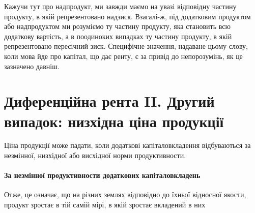 Кажучи тут про надпродукт, ми завжди маємо на увазі відповідну
частину продукту, в якій репрезентовано надзиск. Взагалі-ж, під додатковим
продуктом або надпродуктом ми розуміємо ту частину продукту, яка становить
всю додаткову вартість, а в поодиноких випадках ту частину продукту, в якій
репрезентовано пересічний зиск. Специфічне значення, надаване цьому слову,
коли мова йде про капітал, що дає ренту, є за привід до непорозумінь, як це
зазначено давніш.

\section{Диференційна рента II. Другий випадок: низхідна ціна продукції}

\vspace{3\bigskipamount}
Ціна продукції може падати, коли додаткові капіталовкладення відбуваються
за незмінної, низхідної або висхідної норми продуктивности.

\paragraph{За незмінної продуктивности додаткових капіталовкладень}

Отже, це означає, що на різних землях відповідно до їхньої відносної
якости, продукт зростає в тій самій мірі, в якій зростає вкладений в них
\parbreak{}  %
